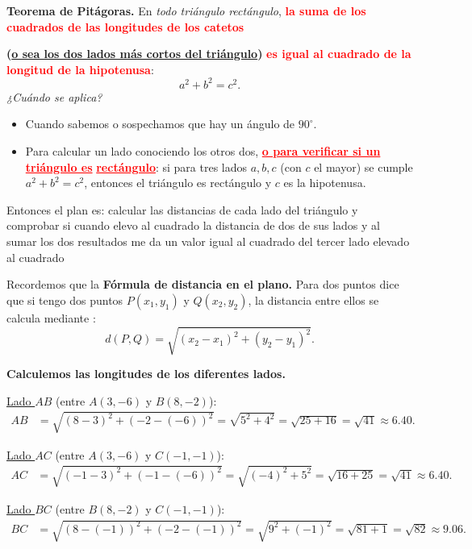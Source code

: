 \documentclass[12pt,a4paper]{article}
\begin{document}
	\textbf{Teorema de Pitágoras.}
	En \emph{todo triángulo rectángulo}, \textcolor{red}{\textbf{la suma de los cuadrados de las longitudes de los catetos}} {\textbf{(\underline{o sea los dos lados más cortos del triángulo})} \textcolor{red}{\textbf{  es igual al cuadrado de la longitud de la hipotenusa}}:
	\[
	a^2+b^2=c^2.
	\]
	\emph{¿Cuándo se aplica?}
	\begin{itemize}
		\item Cuando sabemos o sospechamos que hay un ángulo de \(90^\circ\).
		\item Para calcular un lado conociendo los otros dos, \textcolor{red}{ \underline{\textbf{o para verificar si un triángulo es}}  \underline{\textbf{rectángulo}}}: si para tres lados \(a,b,c\) (con \(c\) el mayor) se cumple \(a^2+b^2=c^2\), entonces el triángulo es rectángulo y \(c\) es la hipotenusa.
	\end{itemize}
	
	Entonces el plan es: calcular las distancias de cada lado del triángulo y comprobar si cuando elevo al cuadrado la distancia de dos de sus lados y al sumar los dos resultados me da un valor igual al cuadrado del tercer lado elevado al cuadrado
	
	\bigskip
	
	Recordemos que la \textbf{Fórmula de distancia en el plano.}
	Para dos puntos dice que si tengo dos puntos  \(P(x_1,y_1)\) y \(Q(x_2,y_2)\), la distancia entre ellos se calcula mediante :
	\[
	d(P,Q)=\sqrt{(x_2-x_1)^2+(y_2-y_1)^2}.
	\]
	
	\bigskip
	
	\textbf{Calculemos las longitudes de los diferentes lados.}
	
	\vspace{3mm}
	
	\underline{Lado \(AB\)} (entre \(A(3,-6)\) y \(B(8,-2)\)):
	\[
	\begin{aligned}
		AB &= \sqrt{(8-3)^2+(-2-(-6))^2}
		= \sqrt{5^2+4^2}
		= \sqrt{25+16}
		= \sqrt{41}\approx 6.40.
	\end{aligned}
	\]
	
	\underline{Lado \(AC\)} (entre \(A(3,-6)\) y \(C(-1,-1)\)):
	\[
	\begin{aligned}
		AC &= \sqrt{(-1-3)^2+(-1-(-6))^2}
		= \sqrt{(-4)^2+5^2}
		= \sqrt{16+25}
		= \sqrt{41}\approx 6.40.
	\end{aligned}
	\]
	
	\underline{Lado \(BC\)} (entre \(B(8,-2)\) y \(C(-1,-1)\)):
	\[
	\begin{aligned}
		BC &= \sqrt{(8-(-1))^2+(-2-(-1))^2}
		= \sqrt{9^2+(-1)^2}
		= \sqrt{81+1}
		= \sqrt{82}\approx 9.06.
	\end{aligned}
	\]
	
}
\end{document}
